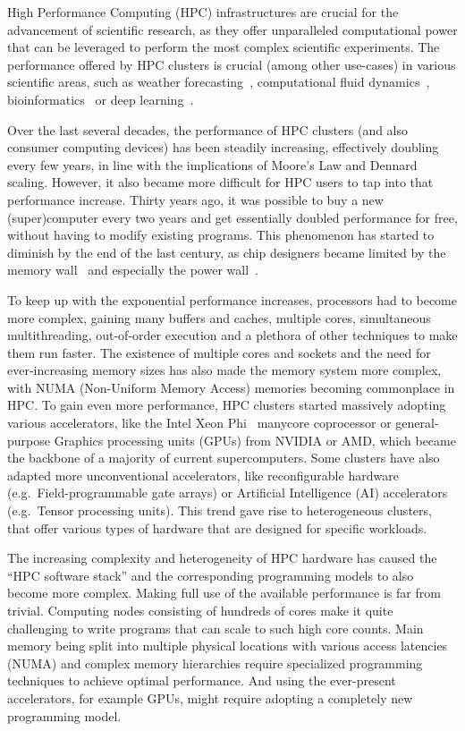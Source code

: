 High Performance Computing (HPC) infrastructures are crucial for the advancement of scientific
research, as they offer unparalleled computational power that can be leveraged to perform the most
complex scientific experiments. The performance offered by HPC clusters is crucial (among other
use-cases) in various scientific areas, such as weather forecasting~\cite{wrf},
computational fluid dynamics~\cite{cfd}, bioinformatics~\cite{bioinformatics} or deep
learning~\cite{hpcdl}.

Over the last several decades, the performance of HPC clusters (and also consumer computing
devices) has been steadily increasing, effectively doubling every few years, in line with the
implications of Moore's Law and Dennard scaling. However, it also became more
difficult for HPC users to tap into that performance increase. Thirty years ago, it was possible to
buy a new (super)computer every two years and get essentially doubled performance for free, without
having to modify existing programs. This phenomenon has started to diminish by the end of the last
century, as chip designers became limited by the memory wall~\cite{memorywall} and especially
the power wall~\cite{powerwall}.

To keep up with the exponential performance increases, processors had to become more complex,
gaining many buffers and caches, multiple cores, simultaneous multithreading, out-of-order
execution and a plethora of other techniques to make them run faster. The existence of multiple
cores and sockets and the need for ever-increasing memory sizes has also made the memory system
more complex, with NUMA (Non-Uniform Memory Access) memories becoming commonplace in HPC\@. To gain
even more performance, HPC clusters started massively adopting various accelerators, like the Intel
Xeon Phi~\cite{xeonphi} manycore coprocessor or general-purpose Graphics processing units
(GPUs) from NVIDIA or AMD, which became the backbone of a majority of current
supercomputers. Some clusters have also adapted more unconventional
accelerators, like reconfigurable hardware (e.g.\ Field-programmable gate arrays) or Artificial
Intelligence (AI) accelerators (e.g.\ Tensor processing units). This trend gave rise to
heterogeneous clusters, that offer various types of hardware that are designed for specific
workloads.

The increasing complexity and heterogeneity of HPC hardware has caused the ``HPC software stack''
and the corresponding programming models to also become more complex. Making full use of the
available performance is far from trivial. Computing nodes consisting of hundreds of cores make it
quite challenging to write programs that can scale to such high core counts. Main memory being
split into multiple physical locations with various access latencies (NUMA) and complex memory
hierarchies require specialized programming techniques to achieve optimal performance. And using
the ever-present accelerators, for example GPUs, might require adopting a completely new
programming model.

